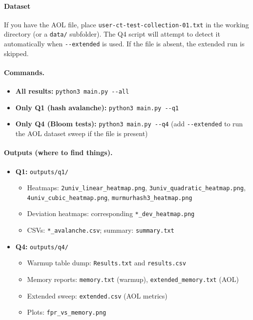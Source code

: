 \documentclass[11pt]{article}
\begin{document}
\paragraph{Dataset}
If you have the AOL file, place \texttt{user-ct-test-collection-01.txt}
in the working directory (or a \texttt{data/} subfolder). The Q4 script will attempt to
detect it automatically when \verb|--extended| is used. If the file is absent, the extended
run is skipped.

\paragraph{Commands.}
\begin{itemize}
  \item \textbf{All results:} \verb|python3 main.py --all|
  \item \textbf{Only Q1 (hash avalanche):} \verb|python3 main.py --q1|
  \item \textbf{Only Q4 (Bloom tests):} \verb|python3 main.py --q4| \quad
        (add \verb|--extended| to run the AOL dataset sweep if the file is present)
\end{itemize}

\paragraph{Outputs (where to find things).}
\begin{itemize}
  \item \textbf{Q1:} \texttt{outputs/q1/}
    \begin{itemize}
      \item Heatmaps: \texttt{2univ\_linear\_heatmap.png}, \texttt{3univ\_quadratic\_heatmap.png},\\
            \texttt{4univ\_cubic\_heatmap.png}, \texttt{murmurhash3\_heatmap.png}
      \item Deviation heatmaps: corresponding \texttt{*\_dev\_heatmap.png}
      \item CSVs: \texttt{*\_avalanche.csv}; summary: \texttt{summary.txt}
    \end{itemize}
  \item \textbf{Q4:} \texttt{outputs/q4/}
    \begin{itemize}
      \item Warmup table dump: \texttt{Results.txt} and \texttt{results.csv}
      \item Memory reports: \texttt{memory.txt} (warmup), \texttt{extended\_memory.txt} (AOL)
      \item Extended sweep: \texttt{extended.csv} (AOL metrics)
      \item Plots: \texttt{fpr\_vs\_memory.png}
    \end{itemize}
\end{itemize}
\end{document}
